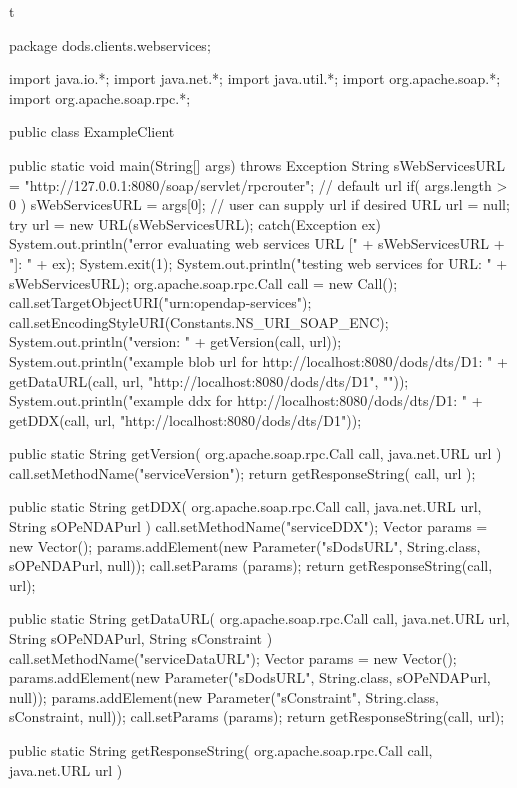 \documentclass[justify]{dods-paper}
\begin{document}
\begin{vcode}{t}

package dods.clients.webservices;

import java.io.*;
import java.net.*;
import java.util.*;
import org.apache.soap.*;
import org.apache.soap.rpc.*;

public class ExampleClient {

	public static void main(String[] args) throws Exception {
		String sWebServicesURL = "http://127.0.0.1:8080/soap/servlet/rpcrouter"; // default url
		if( args.length > 0 ) sWebServicesURL = args[0]; // user can supply url if desired
		URL url = null;
		try {
			url = new URL(sWebServicesURL);
		} catch(Exception ex) {
			System.out.println("error evaluating web services URL [" + sWebServicesURL + "]: " + ex);
			System.exit(1);
		}
		System.out.println("testing web services for URL: " + sWebServicesURL);
		org.apache.soap.rpc.Call call = new Call();
		call.setTargetObjectURI("urn:opendap-services");
		call.setEncodingStyleURI(Constants.NS_URI_SOAP_ENC);
		System.out.println("version: " + getVersion(call, url));
		System.out.println("example blob url for http://localhost:8080/dods/dts/D1: \n" + 
		getDataURL(call, url, "http://localhost:8080/dods/dts/D1", ""));
		System.out.println("example ddx for http://localhost:8080/dods/dts/D1: \n" + 
		getDDX(call, url, "http://localhost:8080/dods/dts/D1"));
	}

	public static String getVersion( org.apache.soap.rpc.Call call, java.net.URL url ){
		call.setMethodName("serviceVersion");
		return getResponseString( call, url );
	}

	public static String getDDX(  org.apache.soap.rpc.Call call, java.net.URL url, String sOPeNDAPurl ){
		call.setMethodName("serviceDDX");
		Vector params = new Vector();
		params.addElement(new Parameter("sDodsURL", String.class, sOPeNDAPurl, null));
		call.setParams (params);
		return getResponseString(call, url);
	}

	public static String getDataURL(  org.apache.soap.rpc.Call call, java.net.URL url, String sOPeNDAPurl, String sConstraint ){
		call.setMethodName("serviceDataURL");
		Vector params = new Vector();
		params.addElement(new Parameter("sDodsURL", String.class, sOPeNDAPurl, null));
		params.addElement(new Parameter("sConstraint", String.class, sConstraint, null));
		call.setParams (params);
		return getResponseString(call, url);
	}

	public static String getResponseString( org.apache.soap.rpc.Call call, java.net.URL url ){

}}
\end{vcode}
\end{document}
